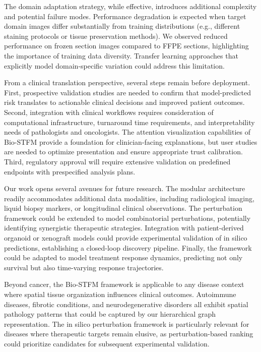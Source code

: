 \documentclass[pdflatex,sn-nature]{sn-jnl}%
\theoremstyle{thmstyleone}%
\theoremstyle{thmstyletwo}%
\theoremstyle{thmstylethree}%
\begin{document}
The domain adaptation strategy, while effective, introduces additional complexity and potential failure modes. Performance degradation is expected when target domain images differ substantially from training distributions (e.g., different staining protocols or tissue preservation methods). We observed reduced performance on frozen section images compared to FFPE sections, highlighting the importance of training data diversity. Transfer learning approaches that explicitly model domain-specific variation could address this limitation.

From a clinical translation perspective, several steps remain before deployment. First, prospective validation studies are needed to confirm that model-predicted risk translates to actionable clinical decisions and improved patient outcomes. Second, integration with clinical workflows requires consideration of computational infrastructure, turnaround time requirements, and interpretability needs of pathologists and oncologists. The attention visualization capabilities of Bio-STFM provide a foundation for clinician-facing explanations, but user studies are needed to optimize presentation and ensure appropriate trust calibration. Third, regulatory approval will require extensive validation on predefined endpoints with prespecified analysis plans.

Our work opens several avenues for future research. The modular architecture readily accommodates additional data modalities\cite{bib60}, including radiological imaging, liquid biopsy markers, or longitudinal clinical observations. The perturbation framework could be extended to model combinatorial perturbations, potentially identifying synergistic therapeutic strategies\cite{bib64}. Integration with patient-derived organoid or xenograft models could provide experimental validation of in silico predictions, establishing a closed-loop discovery pipeline. Finally, the framework could be adapted to model treatment response dynamics\cite{bib59}, predicting not only survival but also time-varying response trajectories.

Beyond cancer, the Bio-STFM framework is applicable to any disease context where spatial tissue organization influences clinical outcomes\cite{bib79,bib80}. Autoimmune diseases, fibrotic conditions, and neurodegenerative disorders all exhibit spatial pathology patterns that could be captured by our hierarchical graph representation. The in silico perturbation framework is particularly relevant for diseases where therapeutic targets remain elusive\cite{bib77,bib78}, as perturbation-based ranking could prioritize candidates for subsequent experimental validation.
\end{document}
